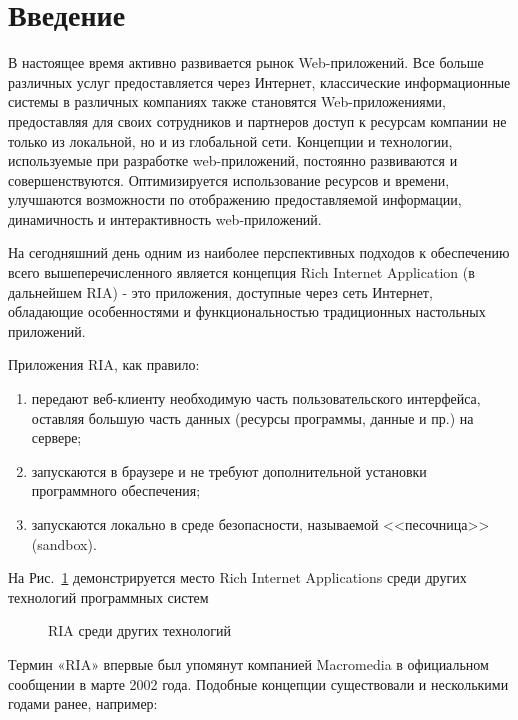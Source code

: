 \chapter*{Введение} %

В настоящее время активно развивается рынок Web-приложений. Все больше различных услуг 
предоставляется через Интернет, классические информационные системы в различных компаниях
 также становятся Web-приложениями, предоставляя для своих сотрудников и партнеров 
 доступ к ресурсам компании не только из локальной, но и из глобальной сети. Концепции 
 и технологии,  используемые при разработке web-приложений, постоянно развиваются и 
 совершенствуются.  Оптимизируется использование ресурсов и времени, улучшаются 
 возможности по отображению предоставляемой информации,  динамичность и интерактивность
  web-приложений.

На сегодняшний день одним из наиболее перспективных подходов к обеспечению всего 
вышеперечисленного является концепция Rich Internet Application (в дальнейшем RIA) - 
это приложения, доступные через сеть Интернет, обладающие  особенностями и 
функциональностью традиционных настольных приложений.
 
Приложения RIA, как правило:

\begin{enumerate}

\item передают веб-клиенту необходимую часть пользовательского   интерфейса, 
оставляя большую часть данных (ресурсы программы, данные и пр.) на сервере;
\item запускаются в браузере  и не требуют дополнительной установки программного 
обеспечения;
\item запускаются локально в среде безопасности, называемой <<песочница>>(sandbox).
\end{enumerate}

На Рис.~\ref{ris:RIAinWorld.png} демонстрируется место Rich Internet Applications 
среди других технологий программных систем
\begin{figure}[h]
\caption{RIA среди других технологий}
\label{ris:RIAinWorld.png}
\end{figure}

Термин «RIA» впервые был упомянут компанией  Macromedia в официальном сообщении в 
марте 2002 года. Подобные концепции существовали и несколькими годами ранее, например:

